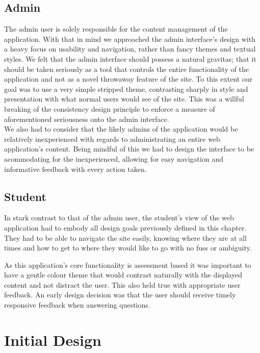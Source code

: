 \documentclass{l3proj}
\begin{document}
\subsection{Admin}

The admin user is solely responsible for the content management of the application. With that in mind we approached the admin interface's design with a heavy focus on usability and navigation, rather than fancy themes and textual styles. We felt that the admin interface should possess a natural gravitas; that it should be taken seriously as a tool that controls the entire functionality of the application and not as a novel throwaway feature of the site. To this extent our goal was to use a very simple stripped theme, contrasting sharply in style and presentation with what normal users would see of the site. This was a willful breaking of the consistency design principle to enforce a measure of aforementioned seriousness onto the admin interface. \\

We also had to consider that the likely admins of the application would be relatively inexperienced with regards to administrating an entire web application's content. Being mindful of this we had to design the interface to be acommodating for the inexperienced, allowing for easy navigation and informative feedback with every action taken.

\subsection{Student}

In stark contrast to that of the admin user, the student's view of the web application had to embody all design goals previously defined in this chapter. They had to be able to navigate the site easily, knowing where they are at all times and how to get to where they would like to go with no fuss or ambiguity.

As this application's core functionality is assessment based it was important to have a gentle colour theme that would contrast naturally with the displayed content and not distract the user. This also held true with appropriate user feedback. An early design decision was that the user should receive timely responsive feedback when answering questions.


\section{Initial Design}
\end{document}
